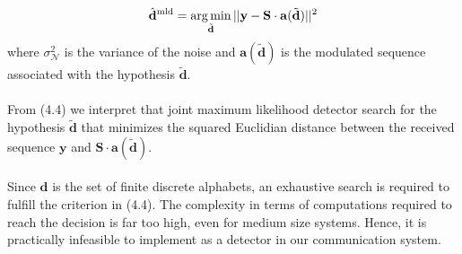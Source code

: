 \begin{equation}
\mathrm{\hat{\mathbf{d}}^{mld}}=\mathop{\mathrm{arg\,min}}_{\mathrm{\tilde{\mathbf{d}}}}\vert \vert \mathrm{\mathbf{y}}-\mathrm{\mathbf{S}}\cdot\mathrm{\mathbf{a}}\mathrm{(\tilde{\mathbf{d}})}\vert\vert^2
\end{equation}
where $\sigma^2_{\mathcal{N}}$ is the variance of the noise and $\mathrm{\mathbf{a}}(\mathrm{\tilde{\mathbf{d}}})$ is the modulated sequence associated with the hypothesis $\mathrm{\tilde{\mathbf{d}}}$.\\ \\
From (4.4) we interpret that joint maximum likelihood detector search for the hypothesis $\mathrm{\tilde{\mathbf{d}}}$ that minimizes the squared Euclidian distance between the received sequence $\mathrm{\mathbf{y}}$ and $\mathrm{\mathbf{S\cdot a(\tilde{d})}}$. \\ \\
Since $\mathrm{\mathbf{d}}$ is the set of finite discrete alphabets, an exhaustive search is required to fulfill the criterion in (4.4). The complexity in terms of computations required to reach the decision is far too high, even for medium size systems. Hence, it is practically infeasible to implement as a detector in our communication system.
